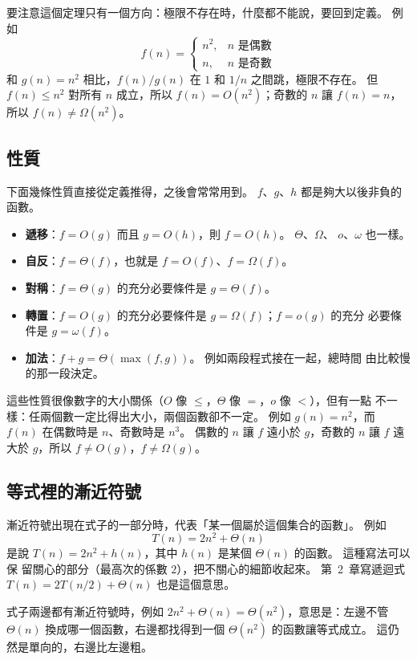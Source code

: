 要注意這個定理只有一個方向：極限不存在時，什麼都不能說，要回到定義。 例如
\[
f(n) = \begin{cases} n^2, & n \text{ 是偶數} \\ n, & n \text{ 是奇數} \end{cases}
\]
和 $g(n) = n^2$ 相比，$f(n)/g(n)$ 在 $1$ 和 $1/n$ 之間跳，極限不存在。 但 $f(n) \le
n^2$ 對所有 $n$ 成立，所以 $f(n) = O(n^2)$；奇數的 $n$ 讓 $f(n) = n$，所以 $f(n) \ne
\Omega(n^2)$。

\subsection{性質}

下面幾條性質直接從定義推得，之後會常常用到。 $f$、$g$、$h$ 都是夠大以後非負的函數。

\begin{itemize}
\item \textbf{遞移}：$f = O(g)$ 而且 $g = O(h)$，則 $f = O(h)$。 $\Theta$、$\Omega$、
$o$、$\omega$ 也一樣。
\item \textbf{自反}：$f = \Theta(f)$，也就是 $f = O(f)$、$f = \Omega(f)$。
\item \textbf{對稱}：$f = \Theta(g)$ 的充分必要條件是 $g = \Theta(f)$。
\item \textbf{轉置}：$f = O(g)$ 的充分必要條件是 $g = \Omega(f)$；$f = o(g)$ 的充分
必要條件是 $g = \omega(f)$。
\item \textbf{加法}：$f + g = \Theta(\max(f, g))$。 例如兩段程式接在一起，總時間
由比較慢的那一段決定。
\end{itemize}

這些性質很像數字的大小關係（$O$ 像 $\le$，$\Theta$ 像 $=$，$o$ 像 $<$），但有一點
不一樣：任兩個數一定比得出大小，兩個函數卻不一定。 例如 $g(n) = n^2$，而
$f(n)$ 在偶數時是 $n$、奇數時是 $n^3$。 偶數的 $n$ 讓 $f$ 遠小於 $g$，奇數的 $n$
讓 $f$ 遠大於 $g$，所以 $f \ne O(g)$，$f \ne \Omega(g)$。

\subsection{等式裡的漸近符號}

漸近符號出現在式子的一部分時，代表「某一個屬於這個集合的函數」。 例如
\[
T(n) = 2n^2 + \Theta(n)
\]
是說 $T(n) = 2n^2 + h(n)$，其中 $h(n)$ 是某個 $\Theta(n)$ 的函數。 這種寫法可以保
留關心的部分（最高次的係數 $2$），把不關心的細節收起來。 第~2~章寫遞迴式
$T(n) = 2T(n/2) + \Theta(n)$ 也是這個意思。

式子兩邊都有漸近符號時，例如 $2n^2 + \Theta(n) = \Theta(n^2)$，意思是：左邊不管
$\Theta(n)$ 換成哪一個函數，右邊都找得到一個 $\Theta(n^2)$ 的函數讓等式成立。 這仍
然是單向的，右邊比左邊粗。

